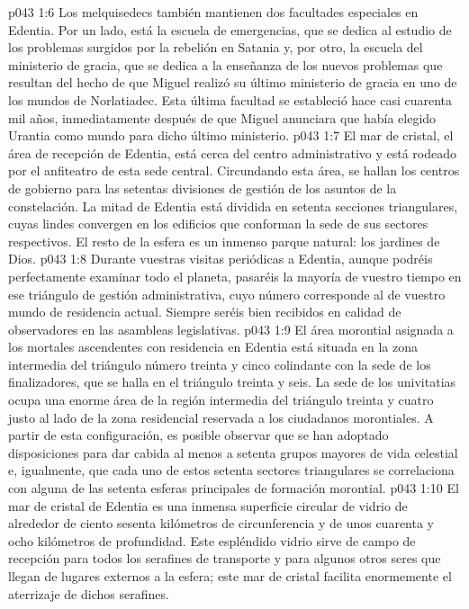 \vs p043 1:6 Los melquisedecs también mantienen dos facultades especiales en Edentia. Por un lado, está la escuela de emergencias, que se dedica al estudio de los problemas surgidos por la rebelión en Satania y, por otro, la escuela del ministerio de gracia, que se dedica a la enseñanza de los nuevos problemas que resultan del hecho de que Miguel realizó su último ministerio de gracia en uno de los mundos de Norlatiadec. Esta última facultad se estableció hace casi cuarenta mil años, inmediatamente después de que Miguel anunciara que había elegido Urantia como mundo para dicho último ministerio.
\vs p043 1:7 \pc El mar de cristal, el área de recepción de Edentia, está cerca del centro administrativo y está rodeado por el anfiteatro de esta sede central. Circundando esta área, se hallan los centros de gobierno para las setentas divisiones de gestión de los asuntos de la constelación. La mitad de Edentia está dividida en setenta secciones triangulares, cuyas lindes convergen en los edificios que conforman la sede de sus sectores respectivos. El resto de la esfera es un inmenso parque natural: los jardines de Dios.
\vs p043 1:8 Durante vuestras visitas periódicas a Edentia, aunque podréis perfectamente examinar todo el planeta, pasaréis la mayoría de vuestro tiempo en ese triángulo de gestión administrativa, cuyo número corresponde al de vuestro mundo de residencia actual. Siempre seréis bien recibidos en calidad de observadores en las asambleas legislativas.
\vs p043 1:9 El área morontial asignada a los mortales ascendentes con residencia en Edentia está situada en la zona intermedia del triángulo número treinta y cinco colindante con la sede de los finalizadores, que se halla en el triángulo treinta y seis. La sede de los univitatias ocupa una enorme área de la región intermedia del triángulo treinta y cuatro justo al lado de la zona residencial reservada a los ciudadanos morontiales. A partir de esta configuración, es posible observar que se han adoptado disposiciones para dar cabida al menos a setenta grupos mayores de vida celestial e, igualmente, que cada uno de estos setenta sectores triangulares se correlaciona con alguna de las setenta esferas principales de formación morontial.
\vs p043 1:10 El mar de cristal de Edentia es una inmensa superficie circular de vidrio de alrededor de ciento sesenta kilómetros de circunferencia y de unos cuarenta y ocho kilómetros de profundidad. Este espléndido vidrio sirve de campo de recepción para todos los serafines de transporte y para algunos otros seres que llegan de lugares externos a la esfera; este mar de cristal facilita enormemente el aterrizaje de dichos serafines.
